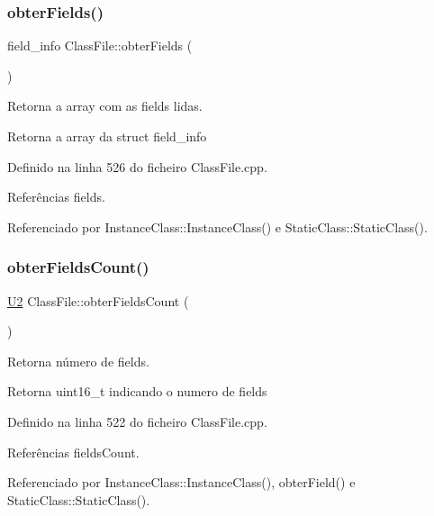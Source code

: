 \subsubsection{\texorpdfstring{obter\+Fields()}{obterFields()}}
{\footnotesize\ttfamily field\+\_\+info Class\+File\+::obter\+Fields (\begin{DoxyParamCaption}{ }\end{DoxyParamCaption})}



Retorna a array com as fields lidas. 

\begin{DoxyReturn}{Retorna}
a array da struct field\+\_\+info 
\end{DoxyReturn}


Definido na linha 526 do ficheiro Class\+File.\+cpp.



Referências fields.



Referenciado por Instance\+Class\+::\+Instance\+Class() e Static\+Class\+::\+Static\+Class().

\mbox{\label{classClassFile_a0be559cd8b7b3168c81a2782e4facb0c}} 
\subsubsection{\texorpdfstring{obter\+Fields\+Count()}{obterFieldsCount()}}
{\footnotesize\ttfamily \hyperlink{BasicTypes_8h_a90240657108b1b457eef9d3f76e0202e}{U2} Class\+File\+::obter\+Fields\+Count (\begin{DoxyParamCaption}{ }\end{DoxyParamCaption})}



Retorna número de fields. 

\begin{DoxyReturn}{Retorna}
uint16\+\_\+t indicando o numero de fields 
\end{DoxyReturn}


Definido na linha 522 do ficheiro Class\+File.\+cpp.



Referências fields\+Count.



Referenciado por Instance\+Class\+::\+Instance\+Class(), obter\+Field() e Static\+Class\+::\+Static\+Class().

